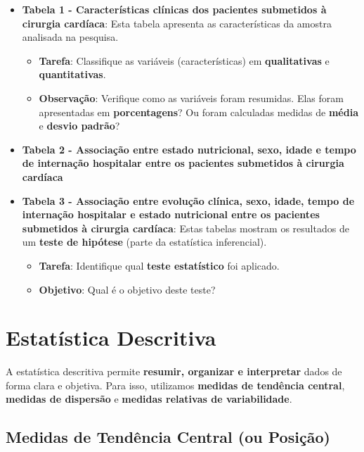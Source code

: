 \documentclass[
]{book}
\providecommand{\tightlist}{%
  \setlength{\itemsep}{0pt}\setlength{\parskip}{0pt}}
\begin{document}
\begin{itemize}
\tightlist
\item
  \textbf{Tabela 1 - Características clínicas dos pacientes submetidos à cirurgia cardíaca}: Esta tabela apresenta as características da amostra analisada na pesquisa.

  \begin{itemize}
  \tightlist
  \item
    \textbf{Tarefa}: Classifique as variáveis (características) em \textbf{qualitativas} e \textbf{quantitativas}.
  \item
    \textbf{Observação}: Verifique como as variáveis foram resumidas. Elas foram apresentadas em \textbf{porcentagens}? Ou foram calculadas medidas de \textbf{média} e \textbf{desvio padrão}?
  \end{itemize}
\item
  \textbf{Tabela 2 - Associação entre estado nutricional, sexo, idade e tempo de internação hospitalar entre os pacientes submetidos à cirurgia cardíaca}\\
\item
  \textbf{Tabela 3 - Associação entre evolução clínica, sexo, idade, tempo de internação hospitalar e estado nutricional entre os pacientes submetidos à cirurgia cardíaca}: Estas tabelas mostram os resultados de um \textbf{teste de hipótese} (parte da estatística inferencial).

  \begin{itemize}
  \tightlist
  \item
    \textbf{Tarefa}: Identifique qual \textbf{teste estatístico} foi aplicado.
  \item
    \textbf{Objetivo}: Qual é o objetivo deste teste?
  \end{itemize}
\end{itemize}

\chapter{Estatística Descritiva}\label{estatuxedstica-descritiva-2}

A estatística descritiva permite \textbf{resumir, organizar e interpretar} dados de forma clara e objetiva. Para isso, utilizamos \textbf{medidas de tendência central}, \textbf{medidas de dispersão} e \textbf{medidas relativas de variabilidade}.

\section{Medidas de Tendência Central (ou Posição)}\label{medidas-de-tenduxeancia-central-ou-posiuxe7uxe3o}
\end{document}
